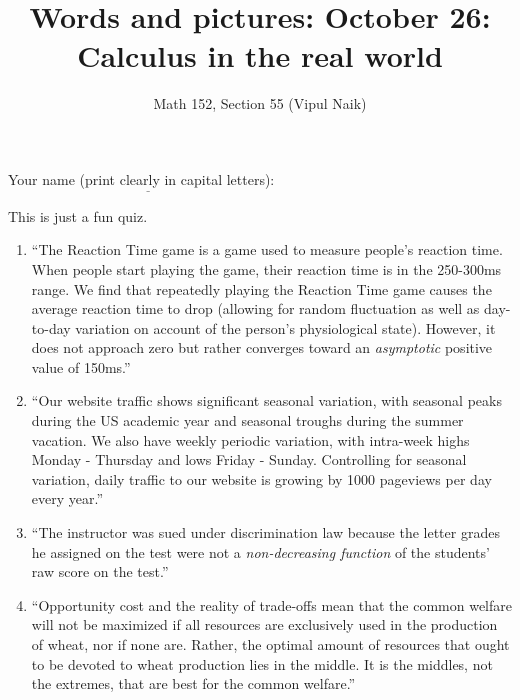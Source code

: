 \documentclass[10pt]{amsart}
\title{Words and pictures: October 26: Calculus in the real world}
\author{Math 152, Section 55 (Vipul Naik)}
\begin{document}
\maketitle

Your name (print clearly in capital letters): $\underline{\qquad\qquad\qquad\qquad\qquad\qquad\qquad\qquad\qquad\qquad}$

This is just a fun quiz.
\begin{enumerate}

\item ``The Reaction Time game is a game used to measure people's
  reaction time. When people start playing the game, their reaction
  time is in the 250-300ms range. We find that repeatedly playing the
  Reaction Time game causes the average reaction time to drop
  (allowing for random fluctuation as well as day-to-day variation on
  account of the person's physiological state). However, it does not
  approach zero but rather converges toward an {\em asymptotic}
  positive value of 150ms.''

  \vspace{1.5in}

\item ``Our website traffic shows significant seasonal variation, with
  seasonal peaks during the US academic year and seasonal troughs
  during the summer vacation. We also have weekly periodic variation,
  with intra-week highs Monday - Thursday and lows Friday -
  Sunday. Controlling for seasonal variation, daily traffic to our
  website is growing by 1000 pageviews per day every year.''

  \vspace{1.5in}

\item ``The instructor was sued under discrimination law because the
  letter grades he assigned on the test were not a {\em non-decreasing
  function} of the students' raw score on the test.''
  
  \vspace{1in}

\item ``Opportunity cost and the reality of trade-offs mean that the
  common welfare will not be maximized if all resources are
  exclusively used in the production of wheat, nor if none
  are. Rather, the optimal amount of resources that ought to be
  devoted to wheat production lies in the middle. It is the middles,
  not the extremes, that are best for the common welfare.''

  \vspace{1in}


\end{enumerate}
\end{document}
